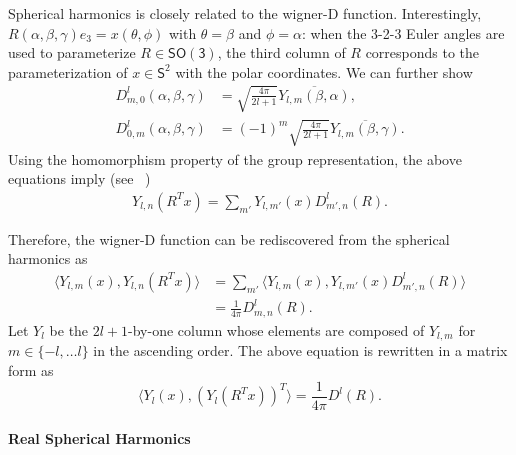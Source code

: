 \documentclass[onecolumn,11pt]{IEEEtran}
\newcommand{\pair}[1]{\ensuremath{\langle #1 \rangle}}
\newcommand{\SO}{\ensuremath{\mathsf{SO(3)}}}
\newcommand{\Sph}{\ensuremath{\mathsf{S}}}
\begin{document}
Spherical harmonics is closely related to the wigner-D function. 
Interestingly, $R(\alpha,\beta,\gamma)e_3=x(\theta,\phi)$ with $\theta=\beta$ and $\phi=\alpha$: when the 3-2-3 Euler angles are used to parameterize $R\in\SO$, the third column of $R$ corresponds to the parameterization of $x\in\Sph^2$ with the polar coordinates.  
We can further show
\begin{align*}
    D^l_{m,0}(\alpha,\beta,\gamma) &= \sqrt{\frac{4\pi}{2l+1}}\overline{Y_{l,m}(\beta,\alpha)},\\
    D^l_{0,m}(\alpha,\beta,\gamma) &= (-1)^m\sqrt{\frac{4\pi}{2l+1}}\overline{Y_{l,m}(\beta,\gamma)}.
\end{align*}
Using the homomorphism property of the group representation, the above equations imply (see ~\cite[pp. 342]{ChiKya01})
\begin{align*}
    Y_{l,n}(R^T x) = \sum_{m'} Y_{l,m'}(x) D^l_{m',n}(R) .
\end{align*}

Therefore, the wigner-D function can be rediscovered from the spherical harmonics as
\begin{align*}
    \pair{Y_{l,m}(x), Y_{l,n}(R^T x) } &= \sum_{m'} \pair{Y_{l,m}(x), Y_{l,m'}(x) D^l_{m',n}(R) }\\
    & = \frac{1}{4\pi} D^l_{m,n}(R).
\end{align*}
Let $Y_l$ be the $2l+1$-by-one column whose elements are composed of $Y_{l,m}$ for $m\in\{-l,\ldots l\}$ in the ascending order. 
The above equation is rewritten in a matrix form as
\[
    \pair{ Y_l(x), (Y_l(R^Tx))^T } = \frac{1}{4\pi} D^l(R).
\]

\paragraph{Real Spherical Harmonics}
\end{document}
